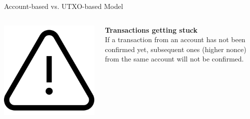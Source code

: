 \documentclass[handout]{beamer}
\begin{document}
\begin{frame}{Account-based vs. UTXO-based Model}
	\begin{columns}[T]
		\begin{column}{0.25\textwidth}
			\center
			\includegraphics[scale=0.1]{../assets/images/alert.png}
		\end{column}
		\begin{column}{0.8\textwidth}
			\textbf{Transactions getting stuck}\\
			If a transaction from an account has not been confirmed yet, subsequent ones (higher nonce) from the same account will not be confirmed.
		\end{column}
	\end{columns}
	\vspace{2em}
\end{frame}
\end{document}
